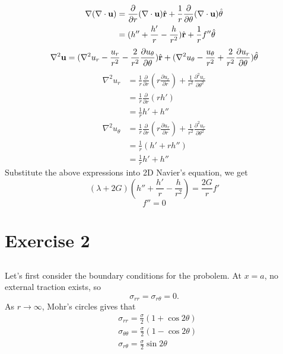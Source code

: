 \documentclass[12pt]{article}
\newcommand{\rr}{{\bf r}}
\newcommand{\uu}{{\bf u}}
\newcommand{\bnabla}{{\bf \nabla}}
\newcommand{\btheta}{{\mathbf \theta}}
\newcommand{\pr}{{\partial}}
\begin{document}
\begin{align*}
  \bnabla (\nabla \cdot\uu) &= \frac{\pr}{\pr r} (\nabla\cdot\uu)\hat\rr + \frac 1 r \frac{\pr}{\pr \theta}(\nabla\cdot\uu)\hat{\btheta} \\
  &=(h'' + \frac{h'}{r} - \frac{h}{r^2})\hat\rr + \frac 1 r f''\hat\btheta
\end{align*}
\[
  \nabla^2 \uu = (\nabla^2u_r - \frac{u_r}{r^2} - \frac{2}{r^2} \frac{\pr u_{\theta}}{\pr {\theta}}) \hat \rr + (\nabla^2 u_{\theta} - \frac{u_{\theta}}{r^2} +
  \frac{2}{r^2}\frac{\pr u_r}{\pr \theta})\hat \theta
\]
\begin{align*}
  \nabla^2u_r &= \frac 1 r \frac{\pr}{\pr r} (r\frac{\pr u_r}{\pr r}) + \frac{1}{r^2}\frac{\pr^2 u_r}{\pr \theta^2}\\
  &=\frac 1 r \frac{\pr}{\pr r} (rh')\\
  &=\frac 1 r h' + h''
\end{align*}
\begin{align*}
  \nabla^2u_{\theta} &= \frac 1 r \frac{\pr}{\pr r} (r\frac{\pr u_r}{\pr r}) + \frac{1}{r^2}\frac{\pr^2 u_r}{\pr \theta^2}\\
  &= \frac 1 r (h' + rh'')\\
  &= \frac 1 r h' + h''
\end{align*}
Substitute the above expressions into 2D Navier's equation, we get
\begin{equation}
  (\lambda+ 2G)(h'' + \frac{h'}{r} - \frac{h}{r^2}) = \frac{2G}{r}f'
\end{equation}
\begin{equation}
  f''=0
\end{equation}




\section{Exercise 2}
\subsection{}
Let's first consider the boundary conditions for the probolem. At $x=a$, no external traction exists, so
\[
\sigma_{rr} = \sigma _{r\theta}=0.
\]
As $r\to\infty$, Mohr's circles gives that
\begin{align*}
 & \sigma_{rr} = \frac \sigma 2(1+\cos2\theta)\\
 & \sigma_{\theta\theta} = \frac \sigma 2(1-\cos2\theta)\\
 & \sigma_{r\theta} = \frac \sigma 2\sin2\theta
\end{align*}
\end{document}
